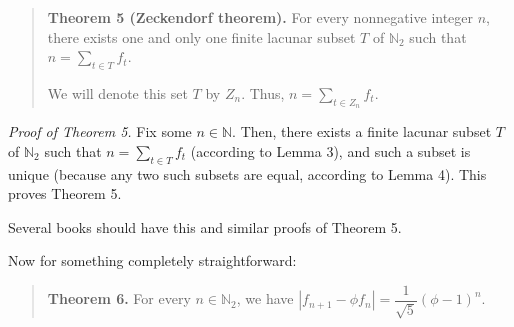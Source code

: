 \documentclass[12pt,final,notitlepage,onecolumn]{article}%
\begin{document}
\begin{quote}
\textbf{Theorem 5 (Zeckendorf theorem).} For every nonnegative integer $n$,
there exists one and only one finite lacunar subset $T$ of $\mathbb{N}_{2}$ such
that $n=\sum\limits_{t\in T}f_{t}$.

We will denote this set $T$ by $Z_{n}$. Thus, $n=\sum\limits_{t\in Z_{n}}%
f_{t}$.
\end{quote}

\textit{Proof of Theorem 5.} Fix some $n\in\mathbb{N}$. Then, there exists a
finite lacunar subset $T$ of $\mathbb{N}_{2}$ such that $n=\sum\limits_{t\in
T}f_{t}$ (according to Lemma 3), and such a subset is unique (because any two
such subsets are equal, according to Lemma 4). This proves Theorem 5.

Several books should have this and similar proofs of Theorem 5.

Now for something completely straightforward:

\begin{quote}
\textbf{Theorem 6.} For every $n\in\mathbb{N}_{2}$, we have $\left\vert
f_{n+1}-\phi f_{n}\right\vert =\dfrac{1}{\sqrt{5}}\left(  \phi-1\right)  ^{n}$.
\end{quote}
\end{document}
